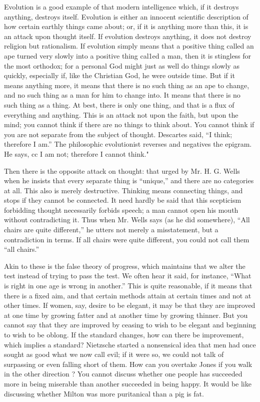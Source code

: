 \documentclass{book}
\begin{document}
Evolution is a good example of that modern intelligence which, if it destroys anything, destroys itself. Evolution is either an innocent scientific description of how certain earthly things came about; or, if it is anything more than this, it is an attack upon thought itself. If evolution destroys anything, it does not destroy religion but rationalism. If evolution simply means that a positive thing called an ape turned very slowly into a positive thing cal1ed a man, then it is stingless for the most orthodox; for a personal God might just as well do things slowly as quickly, especially if, like the Christian God, he were outside time. But if it means anything more, it means that there is no such thing as an ape to change, and no such thing as a man for him to change into. It means that there is no such thing as a thing. At best, there is only one thing, and that is a flux of everything and anything. This is an attack not upon the faith, but upon the mind; you cannot think if there are no things to think about. You cannot think if you are not separate from the subject of thought. Descartes said, “I think; therefore I am.” The philosophic evolutionist reverses and negatives the epigram. He says, cc I am not; therefore I cannot think."

Then there is the opposite attack on thought: that urged by Mr. H. G. Wells when he insists that every separate thing is “unique,” and there are no categories at all. This also is merely destructive. Thinking means connecting things, and stops if they cannot be connected. It need hardly be said that this scepticism forbidding thought necessarily forbids speech; a man cannot open his mouth without contradicting it. Thus when Mr. Wells says (as he did somewhere), “All chairs are quite different,” he utters not merely a misstatement, but a contradiction in terms. If all chairs were quite different, you could not call them “all chairs.”

Akin to these is the false theory of progress, which maintains that we alter the test instead of trying to pass the test. We often hear it said, for instance, “What is right in one age is wrong in another.” This is quite reasonable, if it means that there is a fixed aim, and that certain methods attain at certain times and not at other times. If women, say, desire to be elegant, it may be that they are improved at one time by growing fatter and at another time by growing thinner. But you cannot say that they are improved by ceasing to wish to be elegant and beginning to wish to be oblong. If the standard changes, how can there be improvement, which implies a standard? Nietzsche started a nonsensical idea that men had once sought as good what we now call evil; if it were so, we could not talk of surpassing or even falling short of them. How can you overtake Jones if you walk in the other direction ? You cannot discuss whether one people has succeeded more in being miserable than another succeeded in being happy. It would be like discussing whether Milton was more puritanical than a pig is fat.
\end{document}
